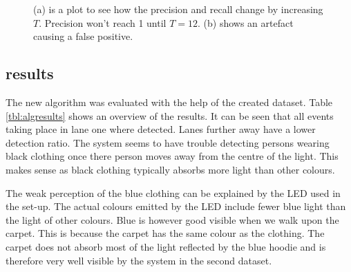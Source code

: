 \begin{figure}
	\centering     %
	\label{fig:Finetuning}
	\caption{(a) is a plot to see how the precision and recall change by increasing $T$. Precision won't reach 1 until $T = 12$. (b) shows an artefact causing a false positive.\label{fig:PnR}}
\end{figure}

\subsection{results}
The new algorithm was evaluated with the help of the created dataset. Table \ref{tbl:algresults} shows an overview of the results. It can be seen that all events taking place in lane one where detected. Lanes further away have a lower detection ratio. The system seems to have trouble detecting persons wearing black clothing once there person moves away from the centre of the light. This makes sense as black clothing typically absorbs more light than other colours.

The weak perception of the blue clothing can be explained by the LED used in the set-up. The actual colours emitted by the LED include fewer blue light than the light of other colours. Blue is however good visible when we walk upon the carpet. This is because the carpet has the same colour as the clothing. The carpet does not absorb most of the light reflected by the blue hoodie and is therefore very well visible by the system in the second dataset.

